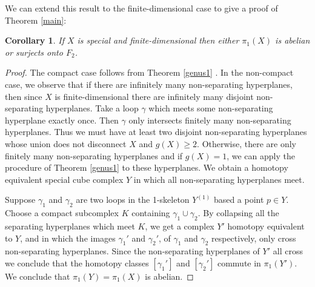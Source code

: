 \documentclass[11pt]{amsart}
\numberwithin{thm}{section}
\newtheorem{corollary}[thm]{Corollary}
\theoremstyle{remark}
\theoremstyle{definition}
\begin{document}
\noindent
We can extend this result to the finite-dimensional case to give a proof of Theorem \ref{main}:
\begin{corollary}\label{Large} If $X$ is special and finite-dimensional then either $\pi_1(X)$ is abelian or surjects onto $F_2$.

\end{corollary}
\begin{proof} The compact case follows from Theorem \ref{genus1} .  In the non-compact case, we observe that if there are infinitely many non-separating hyperplanes, then since $X$ is finite-dimensional there are infinitely many disjoint non-separating hyperplanes.  Take a loop $\gamma$ which meets some non-separating hyperplane exactly once.  Then $\gamma$ only intersects finitely many non-separating hyperplanes.  Thus we must have at least two disjoint non-separating hyperplanes whose union does not disconnect $X$ and $g(X)\geq 2$.  Otherwise, there are only finitely many non-separating hyperplanes and if $g(X)=1$, we can apply the procedure of Theorem \ref{genus1} to these hyperplanes.  We obtain a homotopy equivalent special cube complex $Y$ in which all non-separating hyperplanes meet.  

Suppose $\gamma_1$ and $\gamma_2$ are two loops in the 1-skeleton $Y^{(1)}$ based a point $p\in Y$.  Choose a compact subcomplex $K$ containing $\gamma_1\cup \gamma_2$.  By collapsing all the separating hyperplanes which meet $K$, we get a complex $Y'$ homotopy equivalent to $Y$, and in which the images $\gamma_1'$ and $\gamma_2'$, of $\gamma_1$ and $\gamma_2$ respectively, only cross non-separating hyperplanes.  Since the non-separating hyperplanes of $Y'$ all cross we conclude that the homotopy classes $[\gamma_1']$ and $[\gamma_2']$ commute in $\pi_1(Y')$. We conclude that $\pi_1(Y)=\pi_1(X)$ is abelian.    
\end{proof}
\end{document}
